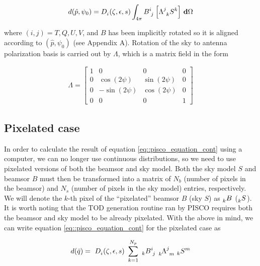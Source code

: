 \documentclass[a4paper,11pt]{article}
\begin{document}
\begin{equation}
\begin{aligned}
d(\hat{p},\psi_0) = \tensor{D}{_{i}}(\zeta,\epsilon,s) \int_{4\pi} \tensor{B}{^{i}_{j} } \left[ \tensor{\Lambda}{^{j}_{k} } \tensor{S}{^{k}} \right ] \, \mathbf{d} \Omega
\end{aligned}
\label{eq::pisco_equation_cont}
\end{equation}

\noindent
where $(i,j) = T,Q,U,V$, and $B$ has been implicitly rotated so it is aligned according to $(\hat{p},\psi_0)$ (see Appendix A). Rotation of the sky to antenna polarization basis is carried out by $\Lambda$, which is a matrix field in the form

\begin{equation}
\begin{aligned}
\Lambda =
\begin{bmatrix}
1  & 0 & 0 & 0\\
0  & \cos(2\psi) & \sin(2\psi) & 0\\
0  &-\sin(2\psi) & \cos(2\psi) & 0\\
0  & 0 & 0 & 1
\end{bmatrix}
\end{aligned}
\label{eq::lambda_operator}
\end{equation}

\subsection{Pixelated case}
\label{sec::pixel_conv}

In order to calculate the result of equation \ref{eq::pisco_equation_cont} using a computer, we can no longer use continuous distributions, so we need to use pixelated versions of both the beamsor and sky model. Both the sky model $S$ and beamsor $B$ must then be transformed into a matrix of $N_b$ (number of pixels in the beamsor) and $N_s$ (number of pixels in the sky model) entries, respectively. We will denote the $k$-th pixel of the ``pixelated'' beamsor $B$ (sky $S$) as $\tensor[_k]{B}{}$ ($\tensor[_k]{S}{}$). It is worth noting that the TOD generation routine ran by PISCO requires both the beamsor and sky model to be already pixelated. With the above in mind, we can write equation \ref{eq::pisco_equation_cont} for the pixelated case as

\begin{equation}
\begin{aligned}
d(\bar{q}) = \
\tensor{D}{_{i}}(\zeta,\epsilon,s) \
\sum_{k=1}^{N_p} \
\tensor[_k]{B}{^i_j} \
\tensor[_k]{\Lambda}{^j_m} \
\tensor[_k]{S}{^m}
\end{aligned}
\label{eq::discrete_beam_conv_tensor}
\end{equation}
\end{document}
